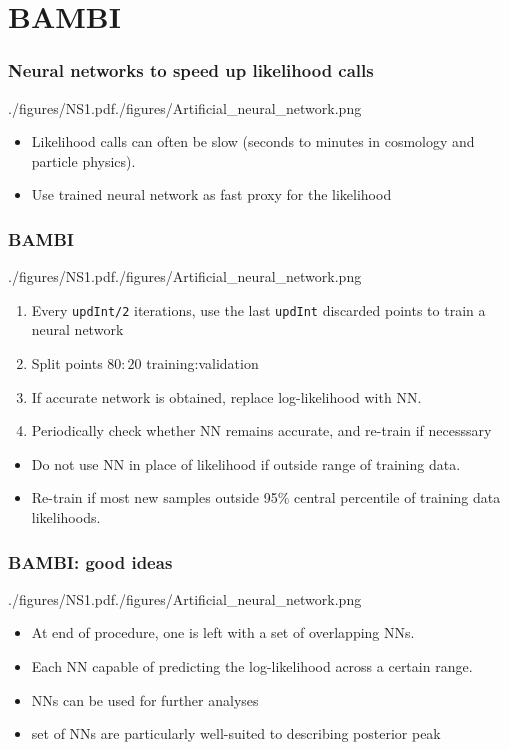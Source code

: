 \documentclass[%
    handout
]{beamer}
\begin{document}
\section{BAMBI}
\begin{frame}
  \frametitle{Neural networks to speed up likelihood calls} 
  \begin{dfigright}[0.65]{./figures/NS1.pdf}{./figures/Artificial_neural_network.png}
    \begin{itemize}
        \item Likelihood calls can often be slow (seconds to minutes in cosmology and particle physics).
        \item Use trained neural network as fast proxy for the likelihood
    \end{itemize}
\end{dfigright}

\end{frame}

\begin{frame}
  \frametitle{BAMBI} 
  \begin{dfigright}[0.65]{./figures/NS1.pdf}{./figures/Artificial_neural_network.png}
    \begin{enumerate}
        \item Every \texttt{updInt/2} iterations, use the last \texttt{updInt} discarded points to train a neural network\label{it:loop1}
        \item Split points $80:20$ training:validation
        \item If accurate network is obtained, replace log-likelihood with NN\@.
        \item Periodically check whether NN remains accurate, and re-train if necesssary
    \end{enumerate}
    \begin{itemize}
        \item Do not use NN in place of likelihood if outside range of training data.
        \item Re-train if most new samples outside 95\% central percentile of training data likelihoods.
    \end{itemize}
\end{dfigright}

\end{frame}

\begin{frame}
  \frametitle{BAMBI\@: good ideas} 
  \begin{dfigright}[0.65]{./figures/NS1.pdf}{./figures/Artificial_neural_network.png}
    \begin{itemize}
        \item At end of procedure, one is left with a set of overlapping NNs.
        \item Each NN capable of predicting the log-likelihood across a certain range.
        \item NNs can be used for further analyses
        \item set of NNs are particularly well-suited to describing posterior peak
    \end{itemize}
\end{dfigright}
\end{frame}
\end{document}

